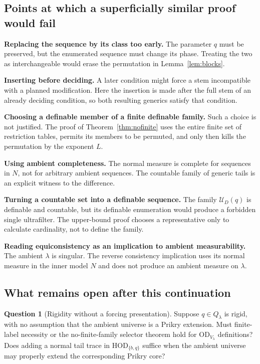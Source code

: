 \documentclass[11pt,letterpaper]{article}
\theoremstyle{definition}
\newtheorem{question}[definition]{Question}
\numberwithin{equation}{section}
\newcommand{\HOD}{\mathrm{HOD}}
\newcommand{\OD}{\mathrm{OD}}
\newcommand{\UU}{\mathcal U}
\begin{document}
\subsection{Points at which a superficially similar proof would fail}

\textbf{Replacing the sequence by its class too early.} The parameter $q$ must be preserved, but the enumerated sequence must change its phase. Treating the two as interchangeable would erase the permutation in Lemma~\ref{lem:blocks}.

\textbf{Inserting before deciding.} A later condition might force a stem incompatible with a planned modification. Here the insertion is made after the full stem of an already deciding condition, so both resulting generics satisfy that condition.

\textbf{Choosing a definable member of a finite definable family.} Such a choice is not justified. The proof of Theorem~\ref{thm:nofinite} uses the entire finite set of restriction tables, permits its members to be permuted, and only then kills the permutation by the exponent $L$.

\textbf{Using ambient completeness.} The normal measure is complete for sequences in $N$, not for arbitrary ambient sequences. The countable family of generic tails is an explicit witness to the difference.

\textbf{Turning a countable set into a definable sequence.} The family $\UU_D(q)$ is definable and countable, but its definable enumeration would produce a forbidden single ultrafilter. The upper-bound proof chooses a representative only to calculate cardinality, not to define the family.

\textbf{Reading equiconsistency as an implication to ambient measurability.} The ambient $\lambda$ is singular. The reverse consistency implication uses its normal measure in the inner model $N$ and does not produce an ambient measure on $\lambda$.

\subsection{What remains open after this continuation}

\begin{question}[Rigidity without a forcing presentation]
Suppose $q\in Q_\lambda$ is rigid, with no assumption that the ambient universe is a Prikry extension. Must finite-label necessity or the no-finite-family selector theorem hold for $\OD_{V_\lambda}$ definitions? Does adding a normal tail trace in $\HOD_{\{b,q\}}$ suffice when the ambient universe may properly extend the corresponding Prikry core?
\end{question}
\end{document}
